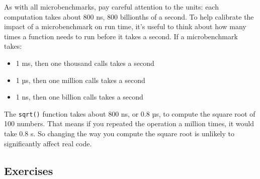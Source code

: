 As with all microbenchmarks, pay careful attention to the units: each
computation takes about 800 ns, 800 billionths of a second. To help
calibrate the impact of a microbenchmark on run time, it's useful to
think about how many times a function needs to run before it takes a
second. If a microbenchmark takes:

\begin{itemize}
\itemsep1pt\parskip0pt
\item
  1 ms, then one thousand calls takes a second
\item
  1 µs, then one million calls takes a second
\item
  1 ns, then one billion calls takes a second
\end{itemize}

The \texttt{sqrt()} function takes about 800 ns, or 0.8 µs, to compute
the square root of 100 numbers. That means if you repeated the operation
a million times, it would take 0.8 s. So changing the way you compute
the square root is unlikely to significantly affect real code.

\subsection{Exercises}

